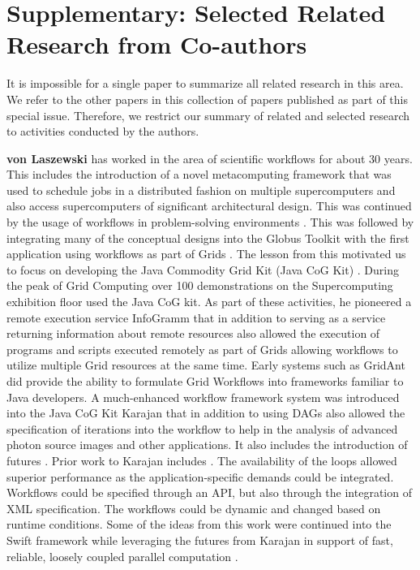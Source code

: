 \section{Supplementary: Selected Related Research from Co-authors}
\label{sec:related}

It is impossible for a single paper to summarize all related research in this area. We refer to the other papers in this collection of papers published as part of this special issue. Therefore, we restrict our summary of related and selected research to activities conducted by the authors.

{\bf von Laszewski} has worked in the area of scientific workflows for about 30 years. This includes the introduction of a novel metacomputing framework \citep{las-99-loosely,las-94-ecwmf,las-96-ecwmf} that was used to schedule jobs in a distributed fashion on multiple supercomputers and also access supercomputers of significant architectural design. 
This was continued by the usage of workflows in problem-solving environments \citep{las-01-pse}. This was followed by integrating many of the conceptual designs into the Globus Toolkit with the first application using workflows as part of Grids \citep{las-00-sbc}. The lesson from this motivated us to focus on developing the Java Commodity Grid Kit (Java CoG Kit) \citep{las-06-workcoordination,
las-06-workflow-book,
las-06-exp-a,
las-05-workflowrepo,
las-05-workflow-jgc,
las-05-exp,
las-04-abstraction-j,
las-03-gridcomputing,
las-02-javacog,
las-00-grande,
las-01-cog-concurency}. 
During the peak of Grid Computing over 100 demonstrations on the Supercomputing exhibition floor used the Java CoG kit. As part of these activities, he pioneered a remote execution service InfoGramm 
\citep{las-02-infogram}
that in addition to serving as a service returning information about remote resources also allowed the execution of programs and scripts executed remotely as part of Grids allowing workflows to utilize multiple Grid resources at the same time. Early systems such as GridAnt \citep{las-04-gridant} 
did provide the ability to formulate Grid Workflows into frameworks familiar to Java developers. A much-enhanced workflow framework system was introduced into the  Java CoG Kit Karajan \citep{las-06-workflow-book} that in addition to using DAGs also allowed the specification of iterations into the workflow to help in the analysis of advanced photon source images and other applications. It also includes the introduction of futures \cite{friedman-futures}. Prior work to Karajan includes \citep{las-04-gridant,las-01-cog-concurency,las-96-ecwmf}. The availability of the loops allowed superior performance as the application-specific demands could be integrated. Workflows could be specified through an API, but also through the integration of XML specification. The workflows could be dynamic and changed based on runtime conditions. Some of the ideas from this work were continued into the Swift framework while leveraging the futures from Karajan in support of fast, reliable, loosely coupled parallel computation \citep{las--7-swift}. 
